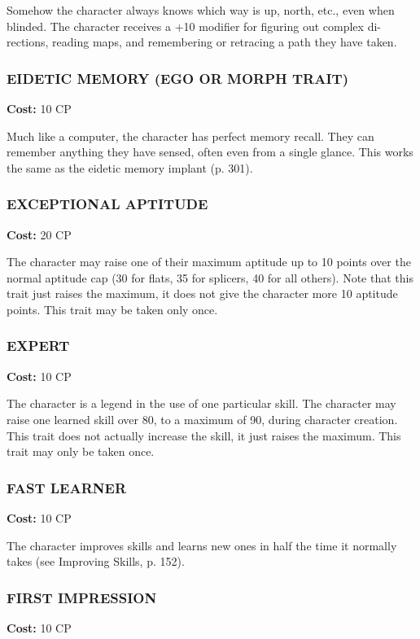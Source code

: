 Somehow the character always knows which way is up, north, etc., even when
blinded. The character receives a +10 modifier for figuring out complex di-
rections, reading maps, and remembering or retracing a path they have taken.

\subsubsection{EIDETIC MEMORY (EGO OR MORPH TRAIT)}
\textbf{Cost:} 10 CP

Much like a computer, the character has perfect memory recall. They can
remember anything they have sensed, often even from a single glance. This works
the same as the eidetic memory implant (p. 301).

\subsubsection{EXCEPTIONAL APTITUDE}
\textbf{Cost:} 20 CP

The character may raise one of their maximum aptitude up to 10 points over the
normal aptitude cap (30 for flats, 35 for splicers, 40 for all others). Note
that this trait just raises the maximum, it does not give the character more 10
aptitude points. This trait may be taken only once.

\subsubsection{EXPERT}
\textbf{Cost:} 10 CP

The character is a legend in the use of one particular skill. The character may
raise one learned skill over 80, to a maximum of 90, during character
creation. This trait does not actually increase the skill, it just raises the
maximum. This trait may only be taken once.

\subsubsection{FAST LEARNER}
\textbf{Cost:} 10 CP

The character improves skills and learns new ones in half the time it normally
takes (see Improving Skills, p. 152).

\subsubsection{FIRST IMPRESSION}
\textbf{Cost:} 10 CP

